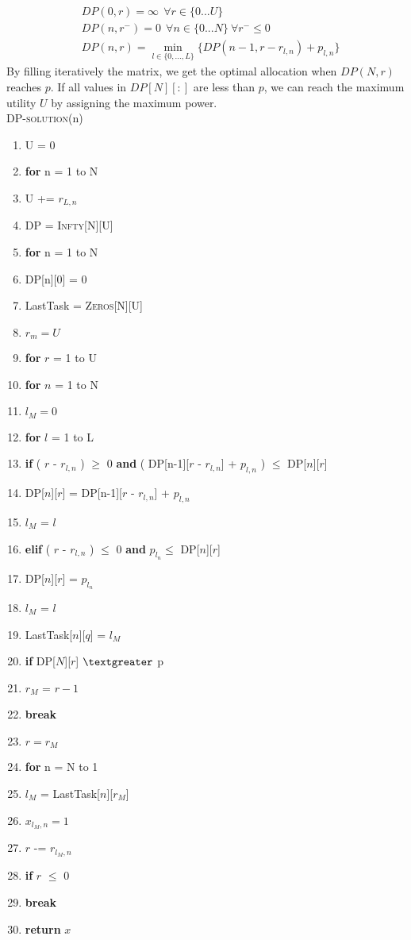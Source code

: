 \documentclass[11pt, oneside]{report}
\begin{document}
\begin{align*}
&DP(0,r) = \infty \ \  \forall r\in \{0...U\} \\
&DP(n,r^{-}) = 0\ \ \forall n\in \{0...N\}\ \forall r^{-} \le 0 \\
&DP(n,r) =  \min_{l \in \{0,...,L\}} \{ DP(n-1, r-r_{l,n}) + p_{l,n} \}
\end{align*}
By filling iteratively the matrix, we get the optimal allocation when $DP(N,r)$ reaches $p$. If all values in $DP[N][:]$ are less than $p$, we can reach the maximum utility $U$ by assigning the maximum power.\\

\noindent\textsc{DP-solution}(n)
\begin{enumerate}[1\ ]
\setlength{\topsep}{0.05ex}
\setlength{\itemsep}{0.05ex}
\item U = 0
\item \textbf{for} n = 1 to N
\item \qquad U += $r_{L,n}$
\item DP = \textsc{Infty}[N][U]
\item \textbf{for} n = 1 to N
\item \qquad DP[n][0] = 0
\item LastTask = \textsc{Zeros}[N][U]
\item $r_m=U$
\item \textbf{for} $r$ = 1 to U
\item \qquad \textbf{for} $n$ = 1 to N
\item \qquad \qquad $l_M = 0$
\item \qquad \qquad \textbf{for} $l$ = 1 to L
\item \qquad \qquad \qquad \textbf{if} ( $r$ - $r_{l,n}$ ) $\geq$ 0 \textbf{and}  ( DP[n-1][$r$ - $r_{l,n}$] + $p_{l,n}$ ) $\leq$ DP[$n$][$r$]
\item \qquad \qquad \qquad \qquad DP[$n$][$r$] = DP[n-1][$r$ - $r_{l,n}$] + $p_{l,n}$
\item \qquad \qquad \qquad \qquad $l_M$ = $l$
\item \qquad \qquad \qquad \textbf{elif} ( $r$ - $r_{l,n}$ ) $\leq$ 0 \textbf{and} $p_{l_n} \leq$ DP[$n$][$r$]
\item \qquad \qquad \qquad \qquad DP[$n$][$r$] = $p_{l_n}$
\item \qquad \qquad \qquad \qquad $l_M$ = $l$
\item \qquad \qquad LastTask[$n$][$q$] = $l_M$
\item \qquad \textbf{if} DP[$N$][$r$] $\textgreater$ p
\item \qquad \qquad $r_M$ = $r-1$
\item \qquad \qquad \textbf{break}
\item $r = r_M$
\item \textbf{for} n = N to 1
\item \qquad $l_M$ = LastTask[$n$][$r_M$]
\item \qquad $x_{l_M, n} = 1$
\item \qquad $r$ -= $r_{l_M, n}$
\item \qquad \textbf{if} $r$ $\leq$ 0
\item \qquad \qquad \textbf{break}
\item \textbf{return} $x$
\end{enumerate}
\end{document}
